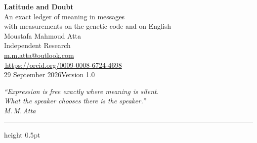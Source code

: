 \documentclass[11pt,a4paper]{article}
\begin{document}
\pagestyle{plain}
\begin{center}
{\sffamily\bfseries\fontsize{24}{28}\selectfont Latitude and Doubt}\\[7pt]
{\sffamily\large An exact ledger of meaning in messages}\\[2pt]
{\sffamily\small with measurements on the genetic code and on English}\\[15pt]
{\large Moustafa Mahmoud Atta}\\[1pt]
{\sffamily\small Independent Research}\\[1pt]
{\sffamily\small \href{mailto:m.m.atta@outlook.com}{m.m.atta@outlook.com}}\\[1pt]
{\sffamily\small \href{https://orcid.org/0009-0008-6724-4698}{\orcidicon\,https://orcid.org/0009-0008-6724-4698}}\\[4pt]
{\sffamily\small 29 September 2026\enspace\textperiodcentered\enspace Version 1.0}
\end{center}
\vspace{4pt}
\begin{flushright}\small\itshape
``Expression is free exactly where meaning is silent.\\ What the speaker chooses there is the speaker.''\\[1pt]
\upshape\footnotesize M.\,M.\,Atta
\end{flushright}
\vspace{4pt}
{\color{mute}\hrule height 0.5pt}\vspace{7pt}
\end{document}
